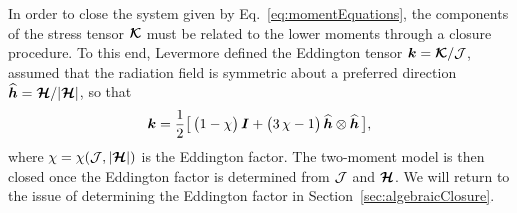 In order to close the system given by Eq.~\eqref{eq:momentEquations}, the components of the stress tensor $\boldsymbol{\mathcal{K}}$ must be related to the lower moments through a closure procedure.  
To this end, Levermore \cite{levermore_1984} defined the Eddington tensor $\boldsymbol{k}=\boldsymbol{\mathcal{K}}/\mathcal{J}$, assumed that the radiation field is symmetric about a preferred direction $\widehat{\boldsymbol{h}}=\boldsymbol{\mathcal{H}}/|\boldsymbol{\mathcal{H}}|$, so that
\begin{equation}
  \boldsymbol{k}=\frac{1}{2}\big[\,\big(1-\chi\big)\,\boldsymbol{I}+\big(3\,\chi-1\big)\,\widehat{\boldsymbol{h}}\otimes\widehat{\boldsymbol{h}}\,\big],
  \label{eq:eddingtonTensor}
\end{equation}
where $\chi=\chi(\mathcal{J},|\boldsymbol{\mathcal{H}}|)$ is the Eddington factor.  
The two-moment model is then closed once the Eddington factor is determined from $\mathcal{J}$ and $\boldsymbol{\mathcal{H}}$.  
We will return to the issue of determining the Eddington factor in Section~\ref{sec:algebraicClosure}.  